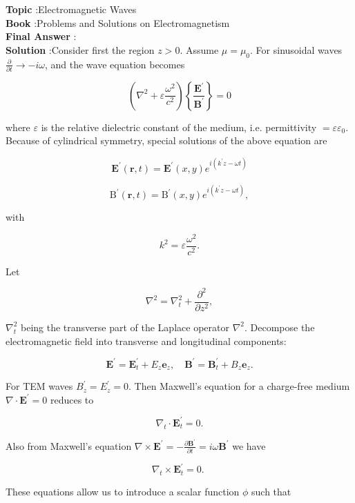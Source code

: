 \documentclass[10pt]{article}
\begin{document}
\textbf{Topic} :Electromagnetic Waves\\
\textbf{Book} :Problems and Solutions on Electromagnetism\\
\textbf{Final Answer} : \\


\textbf{Solution} :Consider first the region $z>0$. Assume $\mu=\mu_{0}$. For sinusoidal waves $\frac{\partial}{\partial t} \rightarrow-i \omega$, and the wave equation becomes

$$
\left(\nabla^{2}+\varepsilon \frac{\omega^{2}}{c^{2}}\right)\left\{\frac{\mathbf{E}^{\prime}}{\mathbf{B}^{\prime}}\right\}=0
$$

where $\varepsilon$ is the relative dielectric constant of the medium, i.e. permittivity $=\varepsilon \varepsilon_{0}$. Because of cylindrical symmetry, special solutions of the above equation are

$$
\mathbf{E}^{\prime}(\mathbf{r}, t)=\mathbf{E}^{\prime}(x, y) e^{i\left(k^{\prime} z-\omega t\right)}
$$



$$
\mathrm{B}^{\prime}(\mathbf{r}, t)=\mathrm{B}^{\prime}(x, y) e^{i\left(k^{\prime} z-\omega t\right)},
$$

with

$$
k^{2}=\varepsilon \frac{\omega^{2}}{c^{2}} .
$$

Let

$$
\nabla^{2}=\nabla_{t}^{2}+\frac{\partial^{2}}{\partial z^{2}},
$$

$\nabla_{t}^{2}$ being the transverse part of the Laplace operator $\nabla^{2}$. Decompose the electromagnetic field into transverse and longitudinal components:

$$
\mathbf{E}^{\prime}=\mathbf{E}_{t}^{\prime}+E_{z} \mathbf{e}_{z}, \quad \mathbf{B}^{\prime}=\mathbf{B}_{t}^{\prime}+B_{z} \mathbf{e}_{z} .
$$

For TEM waves $B_{z}^{\prime}=E_{z}^{\prime}=0$. Then Maxwell's equation for a charge-free medium $\nabla \cdot \mathbf{E}^{\prime}=0$ reduces to

$$
\nabla_{t} \cdot \mathbf{E}_{t}^{\prime}=0 .
$$

Also from Maxwell's equation $\nabla \times \mathbf{E}^{\prime}=-\frac{\partial \mathbf{B}^{\prime}}{\partial t}=i \omega \mathbf{B}^{\prime}$ we have

$$
\nabla_{t} \times \mathbf{E}_{t}^{\prime}=0 \text {. }
$$

These equations allow us to introduce a scalar function $\phi$ such that
\end{document}
